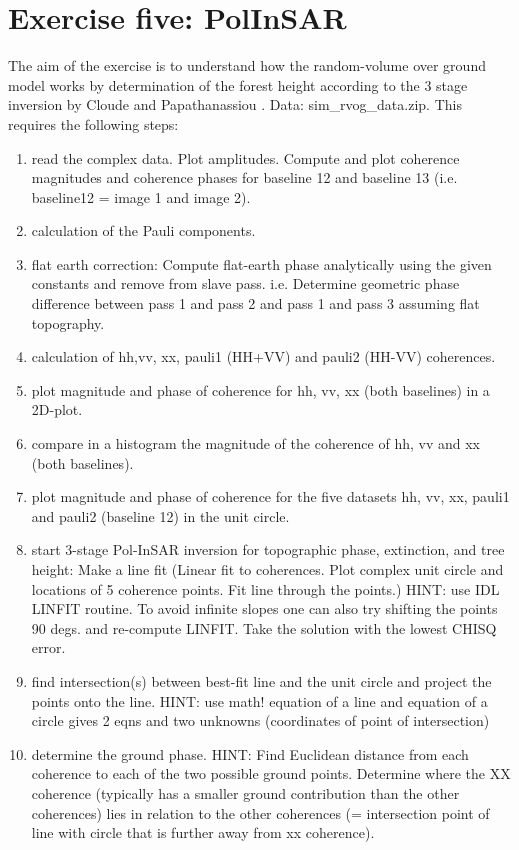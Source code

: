 \newpage
\section{Exercise five: PolInSAR}
The aim of the exercise is to understand how the random-volume over ground model works by  determination of the forest height according to the 3 stage inversion by  Cloude and Papathanassiou \cite{cloude03}. Data: sim\_rvog\_data.zip. This requires the following steps:
\begin{enumerate}
\item read the complex data. Plot amplitudes. Compute and plot coherence magnitudes and coherence phases for baseline 12 and baseline 13 (i.e. baseline12  = image 1 and image 2).
\item calculation of the Pauli components.
\item flat earth correction: Compute flat-earth phase analytically using the given constants and remove from slave pass. i.e. Determine geometric phase difference between pass 1 and pass 2 and pass 1 and pass 3 assuming flat topography. 
\item calculation of hh,vv, xx, pauli1 (HH+VV) and pauli2 (HH-VV) coherences.
\item plot magnitude and phase of coherence for hh, vv, xx (both baselines) in a 2D-plot.
\item compare in a histogram the magnitude of the coherence of hh, vv and xx (both baselines).
\item plot magnitude and phase of coherence for the five datasets hh, vv, xx, pauli1 and pauli2  (baseline 12) in the unit circle.
\item start 3-stage Pol-InSAR inversion for topographic phase, extinction, and tree height: Make a line fit (Linear fit to coherences. Plot complex unit circle and locations of 5 coherence points.  Fit line through the points.) HINT: use IDL LINFIT routine. To avoid infinite slopes one can also try shifting the points 90 degs. and re-compute LINFIT.  Take the solution with the lowest CHISQ error.
\item find intersection(s) between best-fit line and the unit circle and project the points onto the line. HINT: use math!  equation of a line and equation of a circle gives 2 eqns and two unknowns (coordinates of point of intersection)
\item determine the ground phase. HINT: Find Euclidean distance from each coherence to each of the two possible ground points.  Determine where the XX coherence (typically has a smaller ground contribution than the other coherences) lies in relation to the other coherences (= intersection point of line with circle that is further away from xx coherence). 

\end{enumerate}
